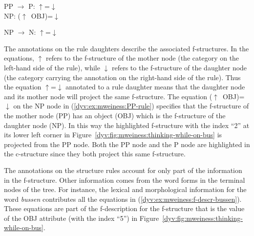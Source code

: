 \documentclass[output=paper]{langsci/langscibook}
\begin{document}
\ea\label{dyv:ex:mweiness:PP-rule}
{\small 
PP	$\rightarrow$	P: $\uparrow$=$\downarrow$ \\
\hspace{2.3em} NP: ($\uparrow$~OBJ)=$\downarrow$
}
\z

\ea\label{dyv:ex:mweiness:NP-rule}
{\small 
NP	$\rightarrow$	N: $\uparrow$=$\downarrow$ \\
}
\z

The annotations on the rule daughters describe the associated f-structures.
In the equations, $\uparrow$ refers to the f-structure of the mother node (the category on the left-hand side of the rule), while $\downarrow$ refers to the f-structure of the daughter node (the category carrying the annotation on the right-hand side of the rule).
Thus the equation $\uparrow$=$\downarrow$ annotated to a rule daughter means that the daughter node and its mother node will project the same f-structure.
The equation ($\uparrow$~OBJ)=$\downarrow$ on the NP node in (\ref{dyv:ex:mweiness:PP-rule}) specifies that the f-structure of the mother node (PP) has an object (OBJ) which is the f-structure of the daughter node (NP).
In this way the highlighted f-structure with the index ``2'' at its lower left corner in Figure~\ref{dyv:fig:mweiness:thinking-while-on-bus} is projected from the PP node.
Both the PP node and the P node are highlighted in the c-structure since they both project this same f-structure.

The annotations on the  structure rules account for only part of the information in the f-structure.
Other information comes from the word forms in the terminal nodes of the tree.
For instance, the lexical and morphological information for the word \textit{bussen} contributes all the equations in (\ref{dyv:ex:mweiness:f-descr-bussen}).
These equations are part of the f-description for the f-structure that is the value of the OBJ attribute (with the index ``5'') in Figure~\ref{dyv:fig:mweiness:thinking-while-on-bus}.

\end{document}
